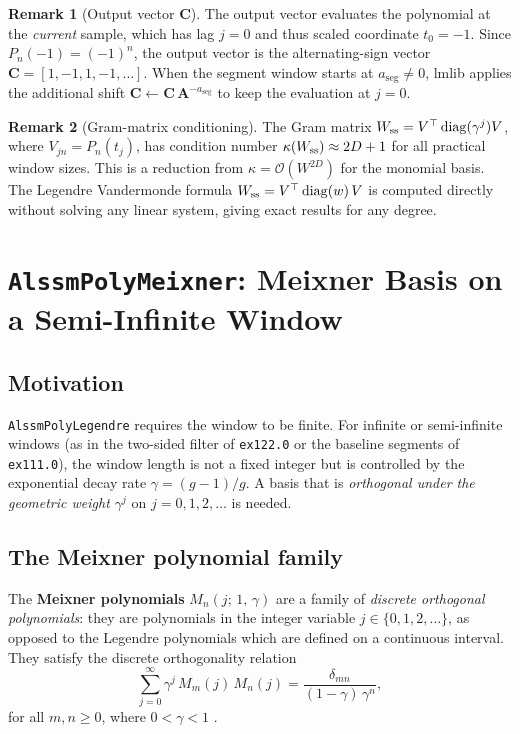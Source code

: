 \documentclass[11pt, a4paper]{article}
\theoremstyle{definition}
\newtheorem{remark}{Remark}
\newcommand{\vC}{\bm{C}}
\newcommand{\mA}{\bm{A}}
\begin{document}
\begin{remark}[Output vector $\vC$]
The output vector evaluates the polynomial at the \emph{current} sample,
which has lag $j=0$ and thus scaled coordinate $t_0 = -1$.  Since
$P_n(-1) = (-1)^n$, the output vector is the alternating-sign vector
$\vC = [1, -1, 1, -1, \ldots]$.  When the segment window starts at
$a_\text{seg} \neq 0$, lmlib applies the additional shift
$\vC \leftarrow \vC\, \mA^{-a_\text{seg}}$ to keep the evaluation at
$j=0$.
\end{remark}

\begin{remark}[Gram-matrix conditioning]
The Gram matrix $W_{\rm ss} = V^\top \operatorname{diag}(\gamma^j) V$,
where $V_{jn} = P_n(t_j)$, has condition number
$\kappa(W_{\rm ss}) \approx 2D+1$ for all practical window sizes.
This is a reduction from $\kappa = \mathcal{O}(W^{2D})$
for the monomial basis.  The Legendre Vandermonde formula
$W_{\rm ss} = V^\top \operatorname{diag}(w)\,V$ is computed directly
without solving any linear system, giving exact results for any degree.
\end{remark}

\section{\texttt{AlssmPolyMeixner}: Meixner Basis on a Semi-Infinite Window}
\label{sec:meixner}

\subsection{Motivation}

\texttt{AlssmPolyLegendre} requires the window to be finite.  For
infinite or semi-infinite windows (as in the two-sided filter of
\texttt{ex122.0} or the baseline segments of \texttt{ex111.0}),
the window length is not a fixed integer but is controlled by the
exponential decay rate $\gamma = (g-1)/g$.  A basis that is
\emph{orthogonal under the geometric weight $\gamma^j$} on
$j = 0, 1, 2, \ldots$ is needed.

\subsection{The Meixner polynomial family}

The \textbf{Meixner polynomials} $M_n(j;\, 1,\, \gamma)$ are a family
of \emph{discrete orthogonal polynomials}: they are polynomials in the
integer variable $j \in \{0, 1, 2, \ldots\}$, as opposed to the Legendre
polynomials which are defined on a continuous interval. They satisfy the
discrete orthogonality relation
\begin{equation}
  \sum_{j=0}^{\infty} \gamma^j\, M_m(j)\, M_n(j)
  = \frac{\delta_{mn}}{(1-\gamma)\,\gamma^n},
  \label{eq:meixner_orthog}
\end{equation}
for all $m, n \geq 0$, where $0 < \gamma < 1$ \cite{Koekoek1998}.
\end{document}
